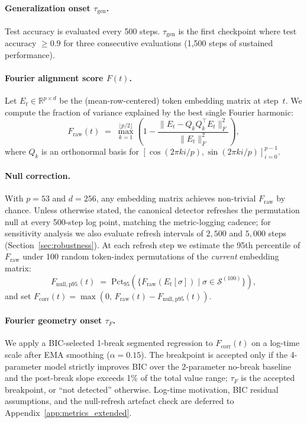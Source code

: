 \documentclass{article}
\newcommand{\taug}{\tau_{\mathrm{gen}}}
\newcommand{\tauf}{\tau_{F}}
\newcommand{\fcorr}{F_{\mathrm{corr}}}
\begin{document}
\paragraph{Generalization onset $\taug$.}
Test accuracy is evaluated every 500 steps.
$\taug$ is the first checkpoint where test accuracy $\geq 0.9$ for
three consecutive evaluations (1{,}500 steps of sustained
performance).

\paragraph{Fourier alignment score $F(t)$.}
Let $E_t \in \mathbb{R}^{p \times d}$ be the (mean-row-centered) token
embedding matrix at step~$t$.
We compute the fraction of variance explained by the best single
Fourier harmonic:
\begin{equation}
  F_{\mathrm{raw}}(t) \;=\; \max_{k=1}^{\lfloor p/2\rfloor}
  \!\left(1 - \frac{\|E_t - Q_k Q_k^\top E_t\|_F^2}
  {\|E_t\|_F^2}\right),
  \label{eq:f_raw}
\end{equation}
where $Q_k$ is an orthonormal basis for
$[\cos(2\pi ki/p),\sin(2\pi ki/p)]_{i=0}^{p-1}$.

\paragraph{Null correction.}
With $p=53$ and $d=256$, any embedding matrix achieves non-trivial
$F_{\mathrm{raw}}$ by chance.
Unless otherwise stated, the canonical detector refreshes the
permutation null at every 500-step log point, matching the
metric-logging cadence; for sensitivity analysis we also evaluate
refresh intervals of $2{,}500$ and $5{,}000$ steps
(Section~\ref{sec:robustness}).
At each refresh step we estimate the 95th percentile of
$F_{\mathrm{raw}}$ under 100 random token-index permutations of the
\emph{current} embedding matrix:
\begin{equation}
  F_{\mathrm{null,p95}}(t) \;=\;
  \mathrm{Pct}_{95}\!\left(
    \{F_{\mathrm{raw}}(E_t[\sigma]) \mid \sigma\in\mathcal{S}^{(100)}\}
  \right),
\end{equation}
and set $\fcorr(t)=\max(0,\,F_{\mathrm{raw}}(t)-F_{\mathrm{null,p95}}(t))$.



\paragraph{Fourier geometry onset $\tauf$.}
We apply a BIC-selected 1-break segmented regression
\citep{schwarz1978estimating} to $\fcorr(t)$ on a log-time scale
after EMA smoothing ($\alpha{=}0.15$). The breakpoint is accepted
only if the 4-parameter model strictly improves BIC over the
2-parameter no-break baseline and the post-break slope exceeds 1\%
of the total value range; $\tauf$ is the accepted breakpoint, or
``not detected'' otherwise. Log-time motivation, BIC residual
assumptions, and the null-refresh artefact check are deferred to
Appendix~\ref{app:metrics_extended}.
\end{document}
